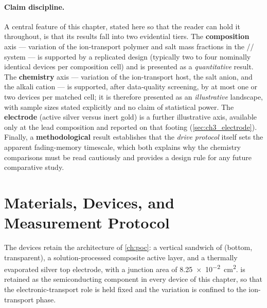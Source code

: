 \documentclass[12pt, twoside]{report}
\begin{document}
\paragraph{Claim discipline.} A central feature of this chapter, stated here so that the reader can hold it throughout, is that its results fall into two evidential tiers. The \textbf{composition} axis --- variation of the ion-transport polymer and salt mass fractions in the \SY{}/\PEO{}/\LiTf{} system --- is supported by a replicated design (typically two to four nominally identical devices per composition cell) and is presented as a \emph{quantitative} result. The \textbf{chemistry} axis --- variation of the ion-transport host, the salt anion, and the alkali cation --- is supported, after data-quality screening, by at most one or two devices per matched cell; it is therefore presented as an \emph{illustrative} landscape, with sample sizes stated explicitly and no claim of statistical power. The \textbf{electrode} (active silver versus inert gold) is a further illustrative axis, available only at the lead composition and reported on that footing (\cref{sec:ch3_electrode}). Finally, a \textbf{methodological} result establishes that the \emph{drive protocol} itself sets the apparent fading-memory timescale, which both explains why the chemistry comparisons must be read cautiously and provides a design rule for any future comparative study.

\section{Materials, Devices, and Measurement Protocol}\label{sec:ch3_materials}

The devices retain the architecture of \cref{ch:poc}: a vertical \twoterminal{} sandwich of \ITO{} (bottom, transparent), a solution-processed composite active layer, and a thermally evaporated silver top electrode, with a junction area of \SI{8.25e-2}{\centi\meter\squared}. \SY{} is retained as the semiconducting component in every device of this chapter, so that the electronic-transport role is held fixed and the variation is confined to the ion-transport phase.
\end{document}

